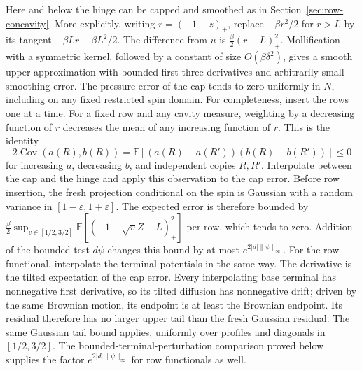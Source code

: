 \documentclass[11pt,a4paper]{article}
\numberwithin{equation}{section}
\theoremstyle{definition}
\theoremstyle{remark}
\newcommand{\E}{\mathbb E}
\newcommand{\eps}{\varepsilon}
\DeclareMathOperator{\Cov}{Cov}
\begin{document}
Here and below the hinge can be capped and smoothed as in
Section~\ref{sec:row-concavity}.  More explicitly, writing $r=(-1-z)_+$,
replace $-\beta r^2/2$ for $r>L$ by its tangent
$-\beta Lr+\beta L^2/2$.  The difference from $u$ is
$\frac\beta2(r-L)_+^2$.  Mollification with a symmetric kernel, followed
by a constant of size
$O(\beta\delta^2)$, gives a smooth upper approximation with bounded first
three derivatives and arbitrarily small smoothing error.  The pressure
error of the cap tends to zero uniformly in $N$, including on any fixed
restricted spin domain.  For completeness, insert the rows one at a time.
For a fixed row and any cavity measure, weighting by a decreasing function
of $r$ decreases the mean of any increasing function of $r$.  This is the
identity
\[
 2\Cov(a(R),b(R))
 =\E[(a(R)-a(R'))(b(R)-b(R'))]\le0
\]
for increasing $a$, decreasing $b$, and independent copies $R,R'$.
Interpolate between the cap and the hinge and apply this observation to
the cap error.  Before row insertion, the fresh projection conditional on
the spin is Gaussian with a random variance in $[1-\eps,1+\eps]$.
The expected error is therefore bounded by
$\frac\beta2\sup_{v\in[1/2,3/2]}\E[(-1-\sqrt v Z-L)_+^2]$ per row,
which tends to zero.  Addition of the bounded test $d\psi$ changes this
bound by at most $e^{2|d|\|\psi\|_\infty}$.  For the row functional, interpolate the terminal potentials in the same
way.  The derivative is the tilted expectation of the cap error.  Every
interpolating base terminal has nonnegative first derivative, so its
tilted diffusion has nonnegative drift; driven by the same Brownian
motion, its endpoint is at least the Brownian endpoint.  Its residual
therefore has no larger upper tail than the fresh Gaussian residual.
The same Gaussian tail bound applies, uniformly over profiles and
diagonals in $[1/2,3/2]$.  The bounded-terminal-perturbation comparison
proved below supplies the factor $e^{2|d|\|\psi\|_\infty}$ for row
functionals as well.
\end{document}
